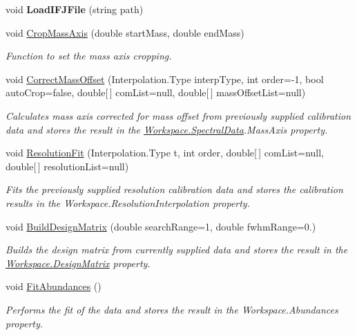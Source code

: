 \begin{DoxyCompactItemize}
\mbox{\label{class_isotope_fit_1_1_workspace_aba9a547d376319e836898f4878ce7aab}} 
void {\bfseries Load\+I\+F\+J\+File} (string path)
\item 
void \hyperlink{class_isotope_fit_1_1_workspace_a9c1e21aff90947ff3414ac9d90472452}{Crop\+Mass\+Axis} (double start\+Mass, double end\+Mass)
\begin{DoxyCompactList}\small\item\em Function to set the mass axis cropping. \end{DoxyCompactList}\item 
void \hyperlink{class_isotope_fit_1_1_workspace_a188d75c84db3eb6b5c3812e44eb95695}{Correct\+Mass\+Offset} (Interpolation.\+Type interp\+Type, int order=-\/1, bool auto\+Crop=false, double\mbox{[}$\,$\mbox{]} com\+List=null, double\mbox{[}$\,$\mbox{]} mass\+Offset\+List=null)
\begin{DoxyCompactList}\small\item\em Calculates mass axis corrected for mass offset from previously supplied calibration data and stores the result in the \hyperlink{class_isotope_fit_1_1_workspace_a1d6cc2dd07cbfe920da9f1bffc9b32c2}{Workspace.\+Spectral\+Data}.Mass\+Axis property. \end{DoxyCompactList}\item 
void \hyperlink{class_isotope_fit_1_1_workspace_a00c1ae2e3b1d443808bef150a1e99410}{Resolution\+Fit} (Interpolation.\+Type t, int order, double\mbox{[}$\,$\mbox{]} com\+List=null, double\mbox{[}$\,$\mbox{]} resolution\+List=null)
\begin{DoxyCompactList}\small\item\em Fits the previously supplied resolution calibration data and stores the calibration results in the Workspace.\+Resolution\+Interpolation property. \end{DoxyCompactList}\item 
void \hyperlink{class_isotope_fit_1_1_workspace_a760f024c67d57242c40c558298bd1878}{Build\+Design\+Matrix} (double search\+Range=1, double fwhm\+Range=0.)
\begin{DoxyCompactList}\small\item\em Builds the design matrix from currently supplied data and stores the result in the \hyperlink{class_isotope_fit_1_1_workspace_ae24a2ee8f965fb2ed7ad3a592163271d}{Workspace.\+Design\+Matrix} property. \end{DoxyCompactList}\item 
void \hyperlink{class_isotope_fit_1_1_workspace_a40fa9b2c0b5d31feae1093d08b1aad52}{Fit\+Abundances} ()
\begin{DoxyCompactList}\small\item\em Performs the fit of the data and stores the result in the Workspace.\+Abundances property. \end{DoxyCompactList}\end{DoxyCompactItemize}
